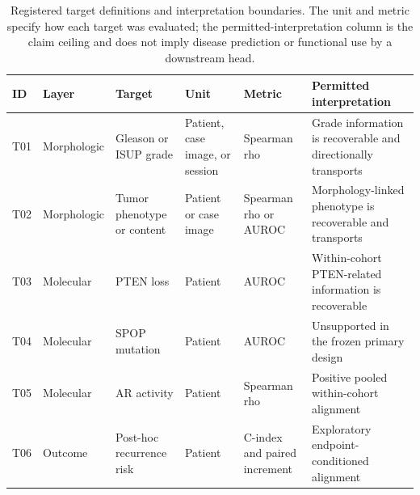 \begin{table}[H]
\centering
\scriptsize
\caption{Registered target definitions and interpretation boundaries. The unit and metric specify how each target was evaluated; the permitted-interpretation column is the claim ceiling and does not imply disease prediction or functional use by a downstream head.}
\label{tab:supp-target-registry}
\begin{tabular}{@{}p{}p{}p{}p{}p{}p{}@{}}
\toprule
ID & Layer & Target & Unit & Metric & Permitted interpretation \\
\midrule
T01 & Morphologic & Gleason or ISUP grade & Patient, case image, or session & Spearman rho & Grade information is recoverable and directionally transports \\
T02 & Morphologic & Tumor phenotype or content & Patient or case image & Spearman rho or AUROC & Morphology-linked phenotype is recoverable and transports \\
T03 & Molecular & PTEN loss & Patient & AUROC & Within-cohort PTEN-related information is recoverable \\
T04 & Molecular & SPOP mutation & Patient & AUROC & Unsupported in the frozen primary design \\
T05 & Molecular & AR activity & Patient & Spearman rho & Positive pooled within-cohort alignment \\
T06 & Outcome & Post-hoc recurrence risk & Patient & C-index and paired increment & Exploratory endpoint-conditioned alignment \\
\bottomrule
\end{tabular}
\end{table}
